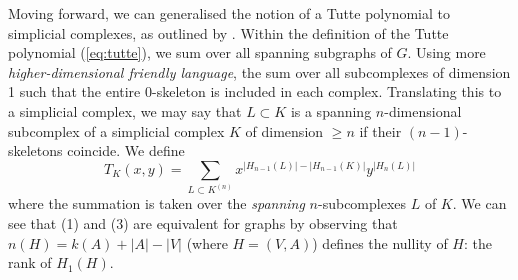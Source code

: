 Moving forward, we can generalised the notion of a Tutte polynomial to simplicial complexes, as outlined by \textcite{krushkal2014polynomial}. Within the definition of the Tutte polynomial (\ref{eq:tutte}), we sum over all spanning subgraphs of $G$. Using more \emph{higher-dimensional friendly language}, the sum over all subcomplexes of dimension 1 such that the entire 0-skeleton is included in each complex. Translating this to a simplicial complex, we may say that $L \subset K$ is a spanning $n$-dimensional subcomplex of a simplicial complex $K$ of dimension $\geq n$ if their $(n-1)$-skeletons coincide. We define
\begin{equation}
  T_K(x,y) = \sum_{L \subset K^{(n)}} x^{\lvert H_{n-1}(L) \rvert - \lvert H_{n-1}(K) \rvert} y^{\lvert H_n(L) \rvert}
\end{equation}
where the summation is taken over the \emph{spanning} $n$-subcomplexes $L$ of $K$.
We can see that (1) and (3) are equivalent for graphs by observing that $n(H) = k(A) + \lvert A \rvert - \lvert V \rvert$ (where $H = (V,A)$) defines the nullity of $H$: the rank of $H_1(H)$.

\printbibliography


